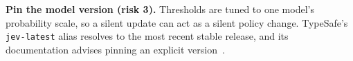 \noindent\textbf{Pin the model version (risk 3).} Thresholds are tuned to one model's probability scale, so a silent update can act as a silent policy change. TypeSafe's \texttt{jev-latest} alias resolves to the most recent stable release, and its documentation advises pinning an explicit version~\cite{typesafe2026docs}.
